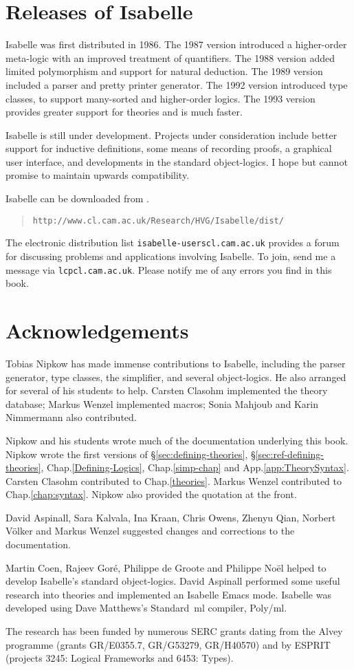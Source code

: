 \section*{Releases of Isabelle}
Isabelle was first distributed in 1986.  The 1987 version introduced a
higher-order meta-logic with an improved treatment of quantifiers.  The
1988 version added limited polymorphism and support for natural deduction.
The 1989 version included a parser and pretty printer generator.  The 1992
version introduced type classes, to support many-sorted and higher-order
logics.  The 1993 version provides greater support for theories and is
much faster.  

Isabelle is still under development.  Projects under consideration include
better support for inductive definitions, some means of recording proofs, a
graphical user interface, and developments in the standard object-logics.
I hope but cannot promise to maintain upwards compatibility.

Isabelle can be downloaded from .
\begin{quote}
{\tt http://www.cl.cam.ac.uk/Research/HVG/Isabelle/dist/}  
\end{quote}
The electronic distribution list {\tt isabelle-users\at cl.cam.ac.uk}
provides a forum for discussing problems and applications involving
Isabelle.  To join, send me a message via {\tt lcp\at cl.cam.ac.uk}.
Please notify me of any errors you find in this book.

\section*{Acknowledgements} 
Tobias Nipkow has made immense contributions to Isabelle, including the
parser generator, type classes, the simplifier, and several object-logics.
He also arranged for several of his students to help.  Carsten Clasohm
implemented the theory database; Markus Wenzel implemented macros; Sonia
Mahjoub and Karin Nimmermann also contributed.  

Nipkow and his students wrote much of the documentation underlying this
book.  Nipkow wrote the first versions of \S\ref{sec:defining-theories},
\S\ref{sec:ref-defining-theories}, Chap.\ts\ref{Defining-Logics},
Chap.\ts\ref{simp-chap} and App.\ts\ref{app:TheorySyntax}\@.  Carsten
Clasohm contributed to Chap.\ts\ref{theories}.  Markus Wenzel contributed
to Chap.\ts\ref{chap:syntax}.  Nipkow also provided the quotation at
the front.

David Aspinall, Sara Kalvala, Ina Kraan, Chris Owens, Zhenyu Qian, Norbert
V{\"o}lker and Markus Wenzel suggested changes and corrections to the
documentation.

Martin Coen, Rajeev Gor\'e, Philippe de Groote and Philippe No\"el helped
to develop Isabelle's standard object-logics.  David Aspinall performed
some useful research into theories and implemented an Isabelle Emacs mode.
Isabelle was developed using Dave Matthews's Standard~{\sc ml} compiler,
Poly/{\sc ml}.  

The research has been funded by numerous SERC grants dating from the Alvey
programme (grants GR/E0355.7, GR/G53279, GR/H40570) and by ESPRIT (projects
3245: Logical Frameworks and 6453: Types).
